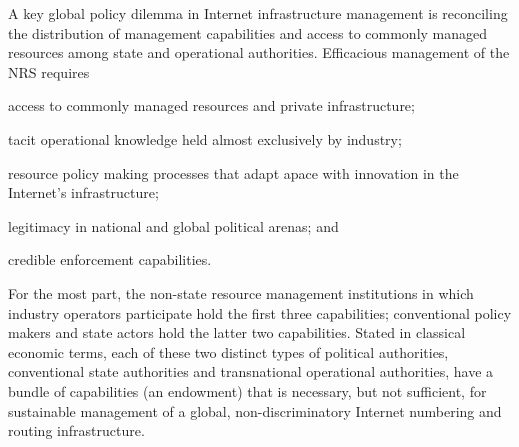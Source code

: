 \documentclass[12pt,journal,compsoc,letterpaper,onecolumn,twoside]{IEEEtran}
\begin{document}
A key global policy dilemma in Internet infrastructure management is
reconciling the distribution of 
management capabilities and access to commonly managed resources among
state and operational authorities.
%
Efficacious management of the NRS requires 
\begin{inparaenum}[\itshape \upshape(1\upshape)] 
  \item access to commonly managed resources and private
    infrastructure;  
  \item tacit operational knowledge held almost exclusively by industry; 
  \item resource policy making processes that adapt apace with
    innovation in the Internet's infrastructure;
  \item legitimacy in national and global political arenas; and 
  \item credible enforcement capabilities.
\end{inparaenum}
%
For the most part, the non-state resource management institutions in
which industry operators
participate hold the
first three 
capabilities; conventional policy makers and state actors hold the latter two
capabilities.
%
Stated in classical economic terms, each of these two distinct types
of political 
authorities, conventional state authorities and transnational
operational authorities, have a bundle of capabilities (an endowment) that is
necessary, but not sufficient, for sustainable management of a global,
non-discriminatory Internet numbering and routing infrastructure.
\end{document}
